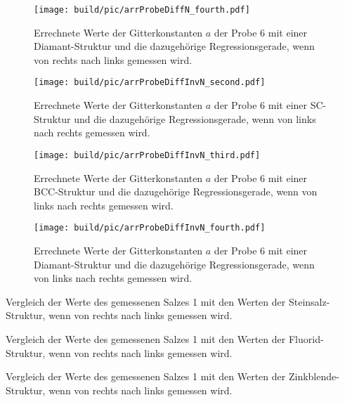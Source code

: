 \begin{figure}
    \centering
    \texttt{[image: build/pic/arrProbeDiffN\_fourth.pdf]}
    \caption{Errechnete Werte der Gitterkonstanten $a$ der Probe 6 mit einer Diamant-Struktur und die dazugehörige Regressionsgerade, wenn von rechts nach links gemessen wird.}
    \label{fig:data_probe_fit_4}
\end{figure}
\clearpage
\begin{figure}
    \centering
    \texttt{[image: build/pic/arrProbeDiffInvN\_second.pdf]}
    \caption{Errechnete Werte der Gitterkonstanten $a$ der Probe 6 mit einer SC-Struktur und die dazugehörige Regressionsgerade, wenn von links nach rechts gemessen wird.}
    \label{fig:data_probe_fit_inv_2}
\end{figure}
\begin{figure}
    \centering
    \texttt{[image: build/pic/arrProbeDiffInvN\_third.pdf]}
    \caption{Errechnete Werte der Gitterkonstanten $a$ der Probe 6 mit einer BCC-Struktur und die dazugehörige Regressionsgerade, wenn von links nach rechts gemessen wird.}
    \label{fig:data_probe_fit_inv_3}
\end{figure}
\begin{figure}
    \centering
    \texttt{[image: build/pic/arrProbeDiffInvN\_fourth.pdf]}
    \caption{Errechnete Werte der Gitterkonstanten $a$ der Probe 6 mit einer Diamant-Struktur und die dazugehörige Regressionsgerade, wenn von links nach rechts gemessen wird.}
    \label{fig:data_probe_fit_inv_4}
\end{figure}
\begin{table}[!htbp]
    \centering
    \caption{Vergleich der Werte des gemessenen Salzes 1 mit den Werten der Steinsalz-Struktur, wenn von rechts nach links gemessen wird.}
    
    \label{tab:salt_vergleich_2}
\end{table}
\begin{table}[!htbp]
    \centering
    \caption{Vergleich der Werte des gemessenen Salzes 1 mit den Werten der Fluorid-Struktur, wenn von rechts nach links gemessen wird.}
    
    \label{tab:salt_vergleich_3}
\end{table}
\begin{table}[!htbp]
    \centering
    \caption{Vergleich der Werte des gemessenen Salzes 1 mit den Werten der Zinkblende-Struktur, wenn von rechts nach links gemessen wird.}
    
    \label{tab:salt_vergleich_4}
\end{table}
